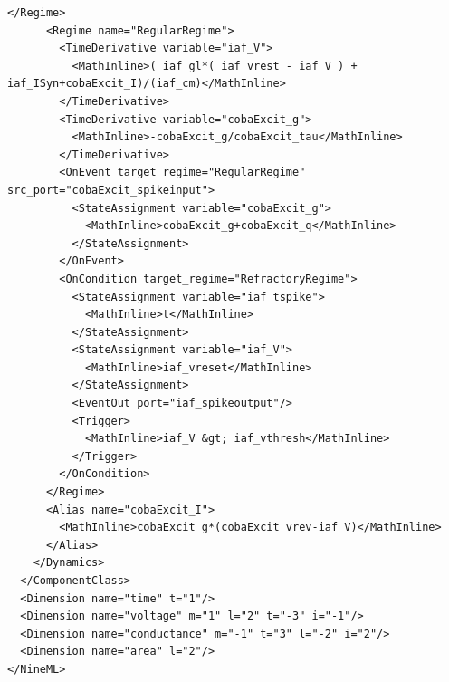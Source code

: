 \documentclass[draftspec]{ninemlspec}
\begin{document}
\begin{lstlisting}[label=code:xmliaf2]
      </Regime>
      <Regime name="RegularRegime">
        <TimeDerivative variable="iaf_V">
          <MathInline>( iaf_gl*( iaf_vrest - iaf_V ) + iaf_ISyn+cobaExcit_I)/(iaf_cm)</MathInline>
        </TimeDerivative>
        <TimeDerivative variable="cobaExcit_g">
          <MathInline>-cobaExcit_g/cobaExcit_tau</MathInline>
        </TimeDerivative>
        <OnEvent target_regime="RegularRegime" src_port="cobaExcit_spikeinput">
          <StateAssignment variable="cobaExcit_g">
            <MathInline>cobaExcit_g+cobaExcit_q</MathInline>
          </StateAssignment>
        </OnEvent>
        <OnCondition target_regime="RefractoryRegime">
          <StateAssignment variable="iaf_tspike">
            <MathInline>t</MathInline>
          </StateAssignment>
          <StateAssignment variable="iaf_V">
            <MathInline>iaf_vreset</MathInline>
          </StateAssignment>
          <EventOut port="iaf_spikeoutput"/>
          <Trigger>
            <MathInline>iaf_V &gt; iaf_vthresh</MathInline>
          </Trigger>
        </OnCondition>
      </Regime>
      <Alias name="cobaExcit_I">
        <MathInline>cobaExcit_g*(cobaExcit_vrev-iaf_V)</MathInline>
      </Alias>
    </Dynamics>
  </ComponentClass>
  <Dimension name="time" t="1"/>
  <Dimension name="voltage" m="1" l="2" t="-3" i="-1"/>
  <Dimension name="conductance" m="-1" t="3" l="-2" i="2"/>
  <Dimension name="area" l="2"/>
</NineML>
\end{lstlisting}
\end{document}
